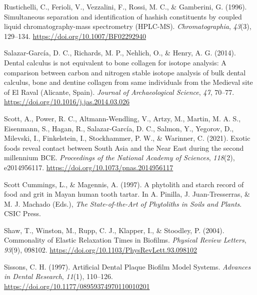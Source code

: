 \documentclass[
  b5paper,
]{book}
\newlength{\cslhangindent}
\newlength{\cslentryspacingunit} %
\newenvironment{CSLReferences}[2] %
 {%
  \setlength{\parindent}{0pt}
  \ifodd #1
  \let\oldpar\par
  \def\par{\hangindent=\cslhangindent\oldpar}
  \fi
  \setlength{\parskip}{#2\cslentryspacingunit}
 }%
 {}
\begin{document}
\begin{CSLReferences}{1}{0}
\leavevmode{}%
Rustichelli, C., Ferioli, V., Vezzalini, F., Rossi, M. C., \& Gamberini,
G. (1996). Simultaneous separation and identification of hashish
constituents by coupled liquid chromatography-mass spectrometry
({HPLC-MS}). \emph{Chromatographia}, \emph{43}(3), 129--134.
\url{https://doi.org/10.1007/BF02292940}

\leavevmode{}%
Salazar-García, D. C., Richards, M. P., Nehlich, O., \& Henry, A. G.
(2014). Dental calculus is not equivalent to bone collagen for isotope
analysis: A comparison between carbon and nitrogen stable isotope
analysis of bulk dental calculus, bone and dentine collagen from same
individuals from the {Medieval} site of {El Raval} ({Alicante},
{Spain}). \emph{Journal of Archaeological Science}, \emph{47}, 70--77.
\url{https://doi.org/10.1016/j.jas.2014.03.026}

\leavevmode{}%
Scott, A., Power, R. C., Altmann-Wendling, V., Artzy, M., Martin, M. A.
S., Eisenmann, S., Hagan, R., Salazar-García, D. C., Salmon, Y.,
Yegorov, D., Milevski, I., Finkelstein, I., Stockhammer, P. W., \&
Warinner, C. (2021). Exotic foods reveal contact between {South Asia}
and the {Near East} during the second millennium {BCE}.
\emph{Proceedings of the National Academy of Sciences}, \emph{118}(2),
e2014956117. \url{https://doi.org/10.1073/pnas.2014956117}

\leavevmode{}%
Scott Cummings, L., \& Magennis, A. (1997). A phytolith and starch
record of food and grit in {Mayan} human tooth tartar. In A. Pinilla, J.
Juan-Tresserras, \& M. J. Machado (Eds.), \emph{The {State-of-the-Art}
of {Phytoliths} in {Soils} and {Plants}}. {CSIC Press}.

\leavevmode{}%
Shaw, T., Winston, M., Rupp, C. J., Klapper, I., \& Stoodley, P. (2004).
Commonality of {Elastic Relaxation Times} in {Biofilms}. \emph{Physical
Review Letters}, \emph{93}(9), 098102.
\url{https://doi.org/10.1103/PhysRevLett.93.098102}

\leavevmode{}%
Sissons, C. H. (1997). Artificial {Dental Plaque Biofilm Model Systems}.
\emph{Advances in Dental Research}, \emph{11}(1), 110--126.
\url{https://doi.org/10.1177/08959374970110010201}


\end{CSLReferences}
\end{document}
